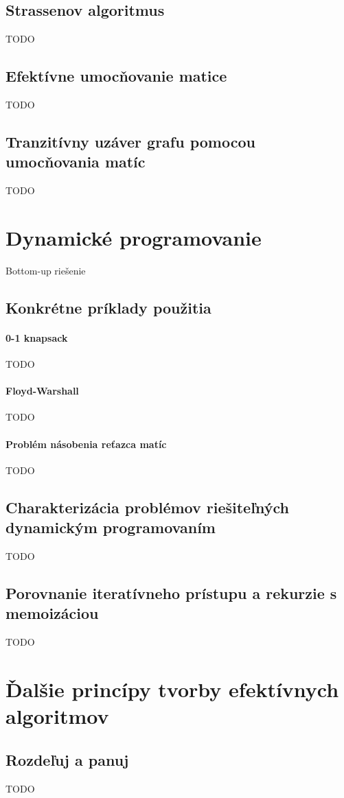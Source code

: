 	\subsection*{Strassenov algoritmus} TODO
	\subsection*{Efektívne umocňovanie matice} TODO
	\subsection*{Tranzitívny uzáver grafu pomocou umocňovania matíc} TODO


\section{Dynamické programovanie}
	Bottom-up riešenie
	\subsection*{Konkrétne príklady použitia} 
		\paragraph{0-1 knapsack} TODO
		\paragraph{Floyd-Warshall} TODO
		\paragraph{Problém násobenia reťazca matíc} TODO

	\subsection*{Charakterizácia problémov riešiteľných dynamickým programovaním} TODO
	\subsection*{Porovnanie iteratívneho prístupu a rekurzie s memoizáciou} TODO


\section{Ďalšie princípy tvorby efektívnych algoritmov}
	\subsection*{Rozdeľuj a panuj}
	TODO

